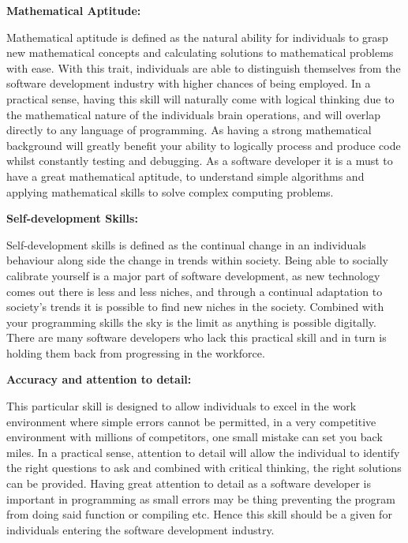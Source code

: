 \documentclass[a4paper, 11pt]{report}
\begin{document}
\bigskip

\textbf{Mathematical Aptitude:}
\par Mathematical aptitude is defined as the natural ability for individuals to grasp new mathematical concepts and calculating solutions to mathematical problems with ease. With this trait, individuals are able to distinguish themselves from the software development industry with higher chances of being employed. In a practical sense, having this skill will naturally come with logical thinking due to the mathematical nature of the individuals brain operations, and will overlap directly to any language of programming. As having a strong mathematical background will greatly benefit your ability to logically process and produce code whilst constantly testing and debugging. As a software developer it is a must to have a great mathematical aptitude, to understand simple algorithms and applying mathematical skills to solve complex computing problems.

\bigskip

\textbf{Self-development Skills:}
\par Self-development skills is defined as the continual change in an individuals behaviour along side the change in trends within society. Being able to socially calibrate yourself is a major part of software development, as new technology comes out there is less and less niches, and through a continual adaptation to society's trends it is possible to find new niches in the society. Combined with your programming skills the sky is the limit as anything is possible digitally. There are many software developers who lack this practical skill and in turn is holding them back from progressing in the workforce. 

\bigskip

\textbf{Accuracy and attention to detail:}
\par This particular skill is designed to allow individuals to excel in the work environment where simple errors cannot be permitted, in a very competitive environment with millions of competitors, one small mistake can set you back miles. In a practical sense, attention to detail will allow the individual to identify the right questions to ask and combined with critical thinking, the right solutions can be provided. Having great attention to detail as a software developer is important in programming as small errors may be thing preventing the program from doing said function or compiling etc. Hence this skill should be a given for individuals entering the software development industry.
\end{document}
